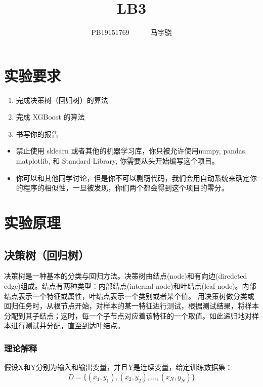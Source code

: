 \documentclass[UTF8,a4paper,AutoFakeBold,AutoFakeSlant]{article}
\title{\textbf{\textsf{{\textsf{LB3} \heiti{机器学习概论}}}}}
\author{\ssong PB19151769~~~~~~马宇骁}
\date{}
\begin{document}
\maketitle

\tableofcontents
\newpage




\section{实验要求}

\begin{enumerate}
  \item 完成决策树（回归树）的算法
  \item 完成 XGBoost 的算法
  \item 书写你的报告
\end{enumerate}

\begin{itemize}
  \item 禁止使用 sklearn 或者其他的机器学习库，你只被允许使用numpy, pandas, matplotlib, 和 Standard Library, 你需要从头开始编写这个项目。
  \item 你可以和其他同学讨论，但是你不可以剽窃代码，我们会用自动系统来确定你的程序的相似性，一旦被发现，你们两个都会得到这个项目的零分。
\end{itemize}




\section{实验原理}

\subsection{决策树（回归树）}

决策树是一种基本的分类与回归方法。决策树由结点(node)和有向边(diredcted edge)组成。结点有两种类型：内部结点(internal node)和叶结点(leaf node)。内部结点表示一个特征或属性，叶结点表示一个类别或者某个值。
用决策树做分类或回归任务时，从根节点开始，对样本的某一特征进行测试，根据测试结果，将样本分配到其子结点；这时，每一个子节点对应着该特征的一个取值。如此递归地对样本进行测试并分配，直至到达叶结点。

\subsubsection{理论解释}
假设X和Y分别为输入和输出变量，并且Y是连续变量，给定训练数据集：
$$ D = \{ (x_1,y_1),(x_2,y_2),\dots, (x_N,y_N) \} $$
\end{document}

